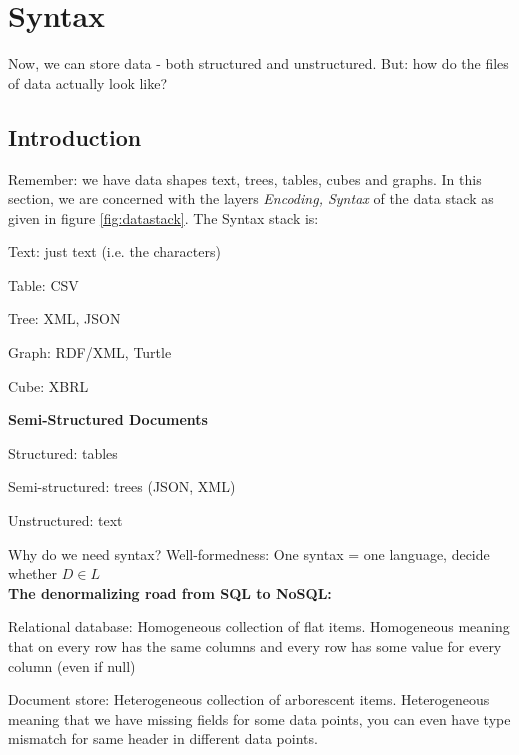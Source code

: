 \documentclass[11pt,oneside,a4paper]{article}
\begin{document}
\section{Syntax}

Now, we can store data - both structured and unstructured. But: how do the files of data actually look like?

\subsection{Introduction}

Remember: we have data shapes text, trees, tables, cubes and graphs. In this section, we are concerned with the layers \textit{Encoding, Syntax} of the data stack as given in figure \ref{fig:datastack}. The Syntax stack is:

\begin{compactitem}
	\item Text: just text (i.e. the characters)
	\item Table: CSV
	\item Tree: XML, JSON
	\item Graph: RDF/XML, Turtle
	\item Cube: XBRL
\end{compactitem}

\textbf{Semi-Structured Documents}

\begin{compactitem}
	\item Structured: tables
	\item Semi-structured: trees (JSON, XML)
	\item Unstructured: text
\end{compactitem}

Why do we need syntax? Well-formedness: One syntax = one language, decide whether $D \in L$\\


\textbf{The denormalizing road from SQL to NoSQL:}

\begin{compactitem}
	\item Relational database: Homogeneous collection of flat items. Homogeneous meaning that on every row has the same columns and every row has some value for every column (even if null)
	\item Document store: Heterogeneous collection of arborescent items. Heterogeneous meaning that we have missing fields for some data points, you can even have type mismatch for same header in different data points.	
\end{compactitem}
\end{document}
